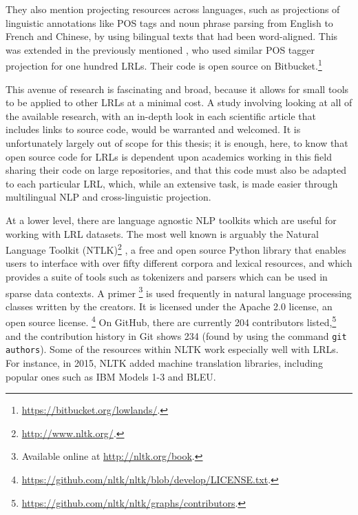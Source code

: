 They also mention projecting resources across languages, such as  projections of linguistic annotations like POS tags and noun phrase parsing from English to French and Chinese, by using bilingual texts that had been word-aligned. This was extended in the previously mentioned \citet{agic2015if}, who used similar POS tagger projection for one hundred LRLs. Their code is open source on Bitbucket.\footnote{\href{https://bitbucket.org/lowlands/}{https://bitbucket.org/lowlands/}. }

This avenue of research is fascinating and broad, because it allows for small tools to be applied to other LRLs at a minimal cost. A study involving looking at all of the available research, with an in-depth look in each scientific article that includes links to source code, would be warranted and welcomed. It is unfortunately largely out of scope for this thesis; it is enough, here, to know that open source code for LRLs is dependent upon academics working in this field sharing their code on large repositories, and that this code must also be adapted to each particular LRL, which, while an extensive task, is made easier through multilingual NLP and cross-linguistic projection.

At a lower level, there are language agnostic NLP toolkits which are useful for working with LRL datasets. The most well known is arguably the Natural Language Toolkit (NTLK)\footnote{\href{http://www.nltk.org/}{http://www.nltk.org/}. } \citep{bird2006nltk}, a free and open source Python library that enables users to interface with over fifty different corpora and lexical resources, and which provides a suite of tools such as tokenizers and parsers which can be used in sparse data contexts. A primer \citep{bird2009natural}\footnote{Available online at \href{http://nltk.org/book}{http://nltk.org/book}. } is used frequently in natural language processing classes written by the creators. It is licensed under the Apache 2.0 license, an open source license. \footnote{\href{https://github.com/nltk/nltk/blob/develop/LICENSE.txt}{https://github.com/nltk/nltk/blob/develop/LICENSE.txt}. } On GitHub, there are currently 204 contributors listed,\footnote{\href{https://github.com/nltk/nltk/graphs/contributors}{https://github.com/nltk/nltk/graphs/contributors}. } and the contribution history in Git shows 234 (found by using the command {\tt git authors}). Some of the resources within NLTK work especially well with LRLs. For instance, in 2015, NLTK added machine translation libraries, including popular ones such as IBM Models 1-3 and BLEU.

